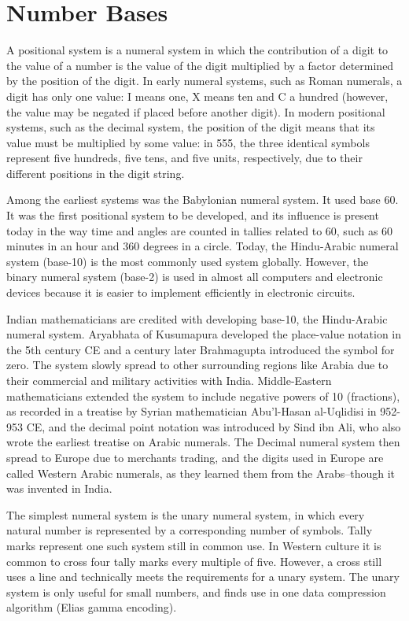 
\chapter{Number Bases\label{sec:numbers}}
\setcounter{examples}{1}

A positional system is a numeral system in which the contribution of a digit to the value of a number 
is the value of the digit multiplied by a factor determined by the position of the digit. In early 
numeral systems, such as Roman numerals, a digit has only one value: I means one, X means ten and C 
a hundred (however, the value may be negated if placed before another digit). In modern positional 
systems, such as the decimal system, the position of the digit means that its value must be multiplied 
by some value: in 555, the three identical symbols represent five hundreds, five tens, and five units, 
respectively, due to their different positions in the digit string. 

Among the earliest systems was the Babylonian numeral system. It used base 60. It was the first 
positional system to be developed, and its influence is present today in the way time and angles are 
counted in tallies related to 60, such as 60 minutes in an hour and 360 degrees in a circle. Today, 
the Hindu-Arabic numeral system (\gls{base-10}) is the most commonly used system globally. However,  
the binary numeral system (\gls{base-2}) is used in almost all computers and electronic devices because it 
is easier to implement efficiently in electronic circuits. 

Indian mathematicians are credited with developing \gls{base-10}, the Hindu-Arabic numeral system.
Aryabhata of Kusumapura developed the place-value notation in the 5th century CE and a century later 
Brahmagupta introduced the symbol for zero. The system slowly spread to other surrounding regions 
like Arabia due to their commercial and military activities with India. Middle-Eastern mathematicians 
extended the system to include negative powers of 10 (fractions), as recorded in a treatise by Syrian 
mathematician Abu'l-Hasan al-Uqlidisi in 952-953 CE, and the decimal point notation was introduced by 
Sind ibn Ali, who also wrote the earliest treatise on Arabic numerals. The Decimal numeral system then 
spread to Europe due to merchants trading, and the digits used in Europe are called Western Arabic numerals, 
as they learned them from the Arabs--though it was invented in India. 

The simplest numeral system is the unary numeral system, in which every natural number is represented by 
a corresponding number of symbols. Tally marks represent one such system still in common use. In Western 
culture it is common to cross four tally marks every multiple of five. However, a cross still uses a line 
and technically meets the requirements for a unary system. The unary system is only useful for small numbers, 
and finds use in one data compression algorithm (Elias gamma encoding).

